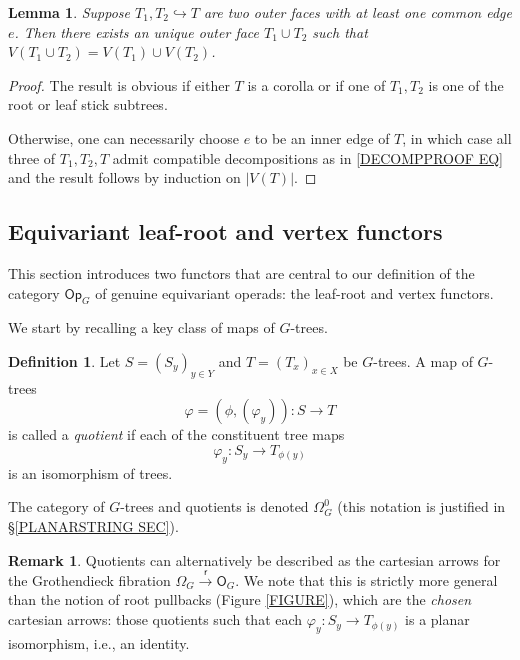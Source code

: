 \documentclass[a4paper,10pt
,draft
]{article}%
\numberwithin{equation}{section}
\numberwithin{figure}{section}
\newtheorem{lemma}[equation]{Lemma}%
\theoremstyle{definition} %
\newtheorem{definition}[equation]{Definition}%
\newtheorem{remark}[equation]{Remark}%
\newcommand{\1}{\ensuremath{\mathbbm 1}}%
\begin{document}
\begin{lemma}\label{OUTERFACEUNION LEM}
	Suppose $T_1,T_2 \hookrightarrow T$ are two outer faces with at least one common edge $e$. Then there exists an unique outer face $T_1 \cup T_2$ such that 
	$V(T_1 \cup T_2) = V(T_1) \cup V(T_2)$.
\end{lemma}

\begin{proof}
	The result is obvious if either
	$T$ is a corolla or if one of $T_1,T_2$
	is one of the root or leaf stick subtrees.

	Otherwise, one can necessarily choose $e$ to be an inner edge of $T$, in which case all three of $T_1,T_2,T$ admit compatible decompositions as in \eqref{DECOMPPROOF EQ} and the result follows by induction on $|V(T)|$.
\end{proof}



\subsection{Equivariant leaf-root and vertex functors}\label{LRVERT SEC}


This section introduces two functors that are central to our definition of the category $\mathsf{Op}_G$ of
genuine equivariant operads: the leaf-root and vertex functors.

We start by recalling a key class of maps of $G$-trees.


\begin{definition}\label{QUOT DEF}
	Let $S = (S_y)_{y \in Y}$ and $T = (T_x)_{x \in X}$
	be $G$-trees.
	A map of $G$-trees 
	\[
	\varphi = (\phi, (\varphi_y))\colon S \to T
	\]
	is called a \textit{quotient} if each of the constituent tree maps
	\[
	\varphi_y \colon S_y \to T_{\phi(y)}
	\]
is an isomorphism of trees.	

The category of $G$-trees and quotients is denoted $\Omega_{G}^0$ (this notation is justified in \S \ref{PLANARSTRING SEC}).
\end{definition}


\begin{remark}
	Quotients can alternatively be described as the cartesian arrows for the Grothendieck fibration
	$\Omega_G \xrightarrow{\mathsf{r}} \mathsf{O}_G$.
	We note that this is strictly more general than the notion of root pullbacks (Figure \ref{FIGURE}), which are the \textit{chosen} cartesian arrows: those quotients such that each
	$\varphi_y \colon S_y \to T_{\phi(y)}$
	is a planar isomorphism, i.e., an identity.
\end{remark}
\end{document}
